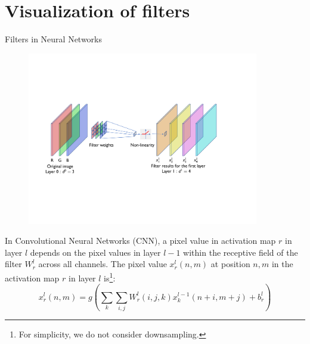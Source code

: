 \documentclass[xcolor=pdftex,dvipsnames,table]{beamer}
\begin{document}


\section{Visualization of filters}

\begin{frame}{Filters in Neural Networks}
\begin{figure}[htb]
\includegraphics[width=0.9\textwidth]{../graphics/CNN_FirstLayer.pdf}
\end{figure}
In Convolutional Neural Networks (CNN), a pixel value in activation map $r$ in layer $l$ depends on the pixel values in layer $l-1$ within the receptive field of the filter $W^{l}_r$ across all channels. The pixel value $x^{l}_{r}(n,m)$ at position $n,m$ in the activation map $r$ in layer $l$ is\footnote{For simplicity, we do not consider downsampling.}: 
\begin{equation}
	x^{l}_{r}(n,m) = g(\sum_{k}\sum_{i,j}W^{l}_r(i,j,k)x^{l-1}_{k}(n+i,m+j) + b^l_r)
\end{equation} 
\end{frame}
\end{document}
